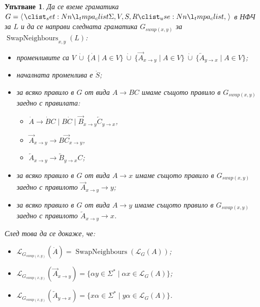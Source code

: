 \documentclass[12pt]{article}
\newtheorem*{hint}{Упътване}
\theoremstyle{definition}
\begin{document}
\begin{hint}
    Да се вземе граматика $G = \opair{\Sigma, V, S, R}$ в НФЧ за $L$ и да се направи следната граматика $G_{swap(x, y)}$ за $\operatorname{SwapNeighbours}_{x, y}(L)$:
    \begin{itemize}
        \item променливите са $V \: \dot \cup \: \{ \dot A \mid A \in V \} \: \dot \cup \: \{ \overrightarrow{A}_{x \rightarrow y} \mid A \in V \} \: \dot \cup \: \{ \overleftarrow{A}_{y \rightarrow x} \mid A \in V \}$;
        \item началната променлива е $\dot S$;
        \item за всяко правило в $G$ от вида $A \rightarrow BC$ имаме същото правило в $G_{swap(x, y)}$ заедно с правилата:
              \begin{itemize}
                  \item $\dot A \rightarrow \dot B C \mid B \dot C \mid \overrightarrow{B}_{x \rightarrow y} \overleftarrow{C}_{y \rightarrow x}$,
                  \item $\overrightarrow{A}_{x \rightarrow y} \rightarrow B \overrightarrow{C}_{x \rightarrow y}$,
                  \item $\overleftarrow{A}_{x \rightarrow y} \rightarrow \overleftarrow{B}_{y \rightarrow x} C$;
              \end{itemize}
        \item за всяко правило в $G$ от вида $A \rightarrow x$ имаме същото правило в $G_{swap(x, y)}$ заедно с правилото $\overrightarrow{A}_{x \rightarrow y} \rightarrow y$;
        \item за всяко правило в $G$ от вида $A \rightarrow y$ имаме същото правило в $G_{swap(x, y)}$ заедно с правилото $\overleftarrow{A}_{x \rightarrow y} \rightarrow x$.
    \end{itemize}
    След това да се докаже, че:
    \begin{itemize}
        \item $\mathcal{L}_{G_{swap(x, y)}}(\dot A) = \operatorname{SwapNeighbours}(\mathcal{L}_G(A))$;
        \item $\mathcal{L}_{G_{swap(x, y)}}(\overrightarrow{A}_{x \rightarrow y}) = \{ \alpha y \in \Sigma^* \mid \alpha x \in \mathcal{L}_G(A) \}$;
        \item $\mathcal{L}_{G_{swap(x, y)}}(\overleftarrow{A}_{y \rightarrow x}) = \{ x \alpha \in \Sigma^* \mid y \alpha \in \mathcal{L}_G(A) \}$.
    \end{itemize}
\end{hint}
\end{document}

